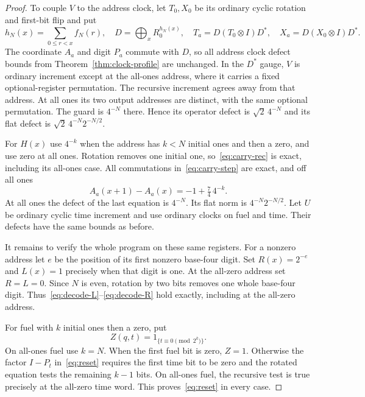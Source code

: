 \begin{proof}
To couple $V$ to the address clock, let $T_0,X_0$ be its ordinary cyclic rotation and first-bit flip and put
\begin{equation}\label{eq:dressing}
 h_N(x)=\sum_{0\le r<x}f_N(r),\quad
 D=\bigoplus_xR_0^{h_N(x)},\quad
 T_a=D(T_0\otimes I)D^*,\quad X_a=D(X_0\otimes I)D^*.
\end{equation}
The coordinate $A_a$ and digit $P_a$ commute with $D$, so all address clock defect bounds from Theorem~\ref{thm:clock-profile} are unchanged. In the $D^*$ gauge, $V$ is ordinary increment except at the all-ones address, where it carries a fixed optional-register permutation. The recursive increment agrees away from that address. At all ones its two output addresses are distinct, with the same optional permutation. The guard is $4^{-N}$ there. Hence its operator defect is $\sqrt2\,4^{-N}$ and its flat defect is $\sqrt2\,4^{-N}2^{-N/2}$.

For $H(x)$ use $4^{-k}$ when the address has $k<N$ initial ones and then a zero, and use zero at all ones. Rotation removes one initial one, so~\eqref{eq:carry-rec} is exact, including its all-ones case. All commutations in~\eqref{eq:carry-step} are exact, and off all ones
\[
 A_a(x+1)-A_a(x)=-1+\tfrac74\,4^{-k}.
\]
At all ones the defect of the last equation is $4^{-N}$. Its flat norm is $4^{-N}2^{-N/2}$. Let $U$ be ordinary cyclic time increment and use ordinary clocks on fuel and time. Their defects have the same bounds as before.

It remains to verify the whole program on these same registers. For a nonzero address let $e$ be the position of its first nonzero base-four digit. Set $R(x)=2^{-e}$ and $L(x)=1$ precisely when that digit is one. At the all-zero address set $R=L=0$. Since $N$ is even, rotation by two bits removes one whole base-four digit. Thus~\eqref{eq:decode-L}--\eqref{eq:decode-R} hold exactly, including at the all-zero address.

For fuel with $k$ initial ones then a zero, put
\[
 Z(q,t)=1_{\{t\equiv0\pmod{2^k}\}}.
\]
On all-ones fuel use $k=N$. When the first fuel bit is zero, $Z=1$. Otherwise the factor $I-P_t$ in~\eqref{eq:reset} requires the first time bit to be zero and the rotated equation tests the remaining $k-1$ bits. On all-ones fuel, the recursive test is true precisely at the all-zero time word. This proves~\eqref{eq:reset} in every case.


\end{proof}
